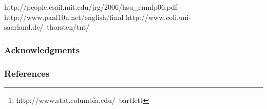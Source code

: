 \documentclass{article}
\title{}
\author{
David Pfau \\
Center for Theoretical Neuroscience \\
Columbia University\\
New York, NY 10027, USA \\
\texttt{pfau@neurotheory.columbia.edu} \\
\AND
Nicholas Bartlett\thanks{ http://www.stat.columbia.edu/~bartlett} \\
Department of Statistics\\
Columbia University\\
New York, NY 10027, USA \\
\texttt{bartlett@stat.columbia.edu} \\
\And
Frank Wood \\
Department of Statistics\\
Columbia University\\
New York, NY 10027, USA \\
\texttt{fwood@stat.columbia.edu} \\
}
\begin{document}
\makeanontitle













http://people.csail.mit.edu/jrg/2006/hsu\_emnlp06.pdf
http://www.panl10n.net/english/final%
http://www.coli.uni-saarland.de/~thorsten/tnt/

\subsubsection*{Acknowledgments}

\subsubsection*{References}
\begin{small}

 
%
\end{small}
\end{document}
